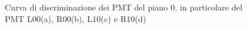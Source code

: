 \begin{figure}[H]
\begin{minipage}{.5\textwidth}
	\end{minipage}%
	\begin{minipage}{.5\textwidth}
		\centering
		\quad
	\end{minipage}
	\caption{Curva di discriminazione dei PMT del piano 0, in particolare del PMT L00(a), R00(b), L10(c) e R10(d)}
\end{figure}

